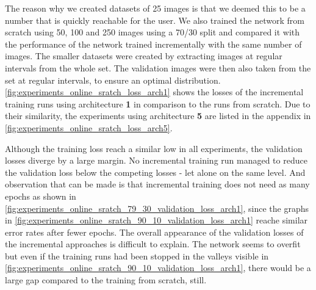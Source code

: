The reason why we created datasets of 25 images is that we deemed this to be a number that is quickly reachable for the user. We also trained the network from scratch using 50, 100 and 250 images using a 70/30 split and compared it with the performance of the network trained incrementally with the same number of images. The smaller datasets were created by extracting images at regular intervals from the whole set. The validation images were then also taken from the set at regular intervals, to ensure an optimal distribution. \fig \ref{fig:experiments_online_sratch_loss_arch1} shows the losses of the incremental training runs using architecture \textbf{1} in comparison to the runs from scratch. Due to their similarity, the experiments using architecture \textbf{5} are listed in the appendix in \fig \ref{fig:experiments_online_sratch_loss_arch5}.

Although the training loss reach a similar low in all experiments, the validation losses diverge by a large margin. No incremental training run managed to reduce the validation loss below the competing losses - let alone on the same level. And observation that can be made is that incremental training does not need as many epochs as shown in \fig \ref{fig:experiments_online_sratch_79_30_validation_loss_arch1}, since the graphs in \fig \ref{fig:experiments_online_sratch_90_10_validation_loss_arch1} reache similar error rates after fewer epochs. The overall appearance of the validation losses of the incremental approaches is difficult to explain. The network seems to overfit but even if the training runs had been stopped in the valleys visible in \fig \ref{fig:experiments_online_sratch_90_10_validation_loss_arch1}, there would be a large gap compared to the training from scratch, still.

